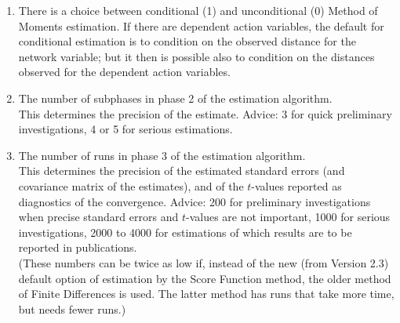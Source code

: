 \documentclass[a4paper,fleqn,11pt]{article}
\newcommand{\+}{\, + \,}
\begin{document}
\begin{enumerate}
\item There is a choice between conditional (1) and unconditional (0)
Method of Moments estimation. If there are dependent action variables, the default for
conditional estimation is to condition on the observed distance
for the network variable; but it then is possible also to condition
on the distances observed for the dependent action variables.\\
\item The number of subphases in phase 2 of the estimation algorithm.\\
      This determines the precision of the estimate.
      Advice: 3 for quick preliminary investigations,
      4 or 5 for serious estimations.
\item The number of runs in phase 3 of the estimation algorithm.\\
      This determines the precision of the estimated standard errors
      (and covariance matrix of the estimates),
      and of the $t$-values reported as diagnostics of the convergence.
      Advice: 200 for preliminary investigations when precise standard errors
      and $t$-values are not important,
      1000 for serious investigations,
      2000 to 4000 for estimations of which results are to be reported
      in publications.\\
      (These numbers can be twice as low if, instead of the
      new (from Version 2.3) default option of estimation by the
      Score Function method, the older method of
      Finite Differences is used. The latter method has runs
      that take more time, but needs fewer runs.)

\end{enumerate}
\end{document}
